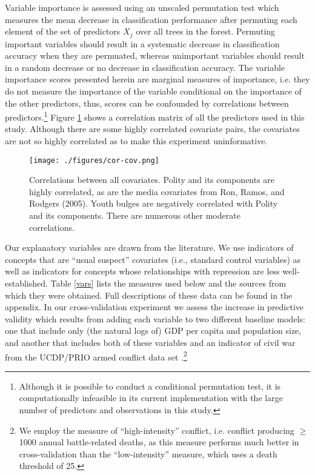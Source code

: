 \documentclass[12pt]{article}
\begin{document}
Variable importance is assessed using an unscaled permutation test which measures the mean decrease in classification performance after permuting each element of the set of predictors $X_j$ over all trees in the forest. Permuting important variables should result in a systematic decrease in classification accuracy when they are permuated, whereas unimportant variables should result in a random decrease or no decrease in classification accuracy. The variable importance scores presented herein are marginal measures of importance, i.e. they do not measure the importance of the variable conditional on the importance of the other predictors, thus, scores can be confounded by correlations between predictors.\footnote{Although it is possible to conduct a conditional permutation test, it is computationally infeasible in its current implementation with the large number of predictors and observations in this study.} Figure \ref{fig:cor-cov} shows a correlation matrix of all the predictors used in this study. Although there are some highly correlated covariate pairs, the covariates are not so highly correlated as to make this experiment uninformative.

\begin{figure}[!htpb]
\texttt{[image: ./figures/cor-cov.png]}
\caption{Correlations between all covariates. Polity and its components are highly correlated, as are the media covariates from Ron, Ramos, and Rodgers (2005). Youth bulges are negatively correlated with Polity and its components. There are numerous other moderate correlations.}
\label{fig:cor-cov}
\end{figure}

Our explanatory variables are drawn from the literature. We use indicators of concepts that are ``usual suspect'' covariates (i.e., standard control variables) as well as indicators for concepts whose relationships with repression are less well-established. Table \ref{vars} lists the measures used below and the sources from which they were obtained. Full descriptions of these data can be found in the appendix. In our cross-validation experiment we assess the increase in predictive validity which results from adding each variable to two different baseline models: one that include only (the natural logs of) GDP per capita and population size, and another that includes both of these variables and an indicator of civil war from the UCDP/PRIO armed conflict data set \citep{ThemnerWallensteen2012}.\footnote{We employ the measure of ``high-intensity'' conflict, i.e. conflict producing $\geq$ 1000 annual battle-related deaths, as this measure performs much better in cross-validation than the ``low-intensity'' measure, which uses a death threshold of 25.}
\end{document}
